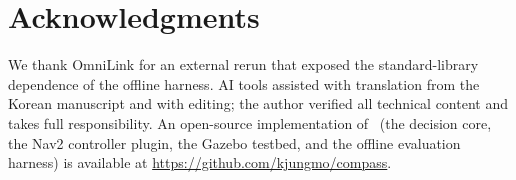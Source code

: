 \section*{Acknowledgments}

We thank OmniLink for an external rerun that exposed the standard-library dependence of the offline harness. AI tools assisted with translation from the Korean manuscript and with editing; the author verified all technical content and takes full responsibility. An open-source implementation of \sname\ (the decision core, the Nav2 controller plugin, the Gazebo testbed, and the  offline evaluation harness) is available at \url{https://github.com/kjungmo/compass}.
